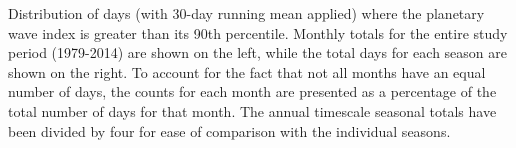 \label{fig:annual_distribution}
Distribution of days (with 30-day running mean applied) where the planetary wave index is greater than its 90th percentile. Monthly totals for the entire study period (1979-2014) are shown on the left, while the total days for each season are shown on the right. To account for the fact that not all months have an equal number of days, the counts for each month are presented as a percentage of the total number of days for that month. The annual timescale seasonal totals have been divided by four for ease of comparison with the individual seasons.   